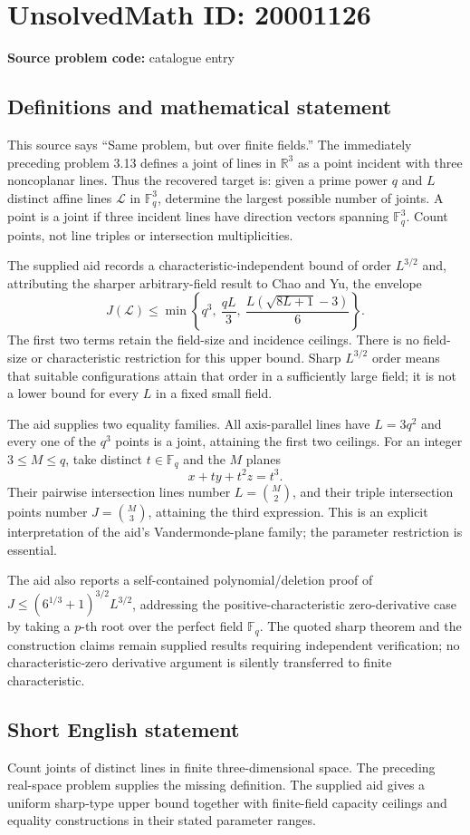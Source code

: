 \documentclass[11pt]{article}
\newcommand{\R}{\mathbb{R}}
\newcommand{\F}{\mathbb{F}}
\begin{document}
\section*{UnsolvedMath ID: 20001126}
\textbf{Source problem code:} catalogue entry
\subsection{Definitions and mathematical statement}
This source says ``Same problem, but over finite fields.'' The immediately preceding problem 3.13 defines a joint of lines in $\R^3$ as a point incident with three noncoplanar lines. Thus the recovered target is: given a prime power $q$ and $L$ distinct affine lines $\mathcal L$ in $\F_q^3$, determine the largest possible number of joints. A point is a joint if three incident lines have direction vectors spanning $\F_q^3$. Count points, not line triples or intersection multiplicities.

The supplied aid records a characteristic-independent bound of order $L^{3/2}$ and, attributing the sharper arbitrary-field result to Chao and Yu, the envelope
\[
 J(\mathcal L)\leq
 \min\left\{q^3,\ \frac{qL}{3},\
 \frac{L(\sqrt{8L+1}-3)}6\right\}.
\]
The first two terms retain the field-size and incidence ceilings. There is no field-size or characteristic restriction for this upper bound. Sharp $L^{3/2}$ order means that suitable configurations attain that order in a sufficiently large field; it is not a lower bound for every $L$ in a fixed small field.

The aid supplies two equality families. All axis-parallel lines have $L=3q^2$ and every one of the $q^3$ points is a joint, attaining the first two ceilings. For an integer $3\leq M\leq q$, take distinct $t\in\F_q$ and the $M$ planes
\[
 x+t y+t^2z=t^3.
\]
Their pairwise intersection lines number $L=\binom M2$, and their triple intersection points number $J=\binom M3$, attaining the third expression. This is an explicit interpretation of the aid's Vandermonde-plane family; the parameter restriction is essential.

The aid also reports a self-contained polynomial/deletion proof of
$J\leq(6^{1/3}+1)^{3/2}L^{3/2}$, addressing the positive-characteristic zero-derivative case by taking a $p$-th root over the perfect field $\F_q$. The quoted sharp theorem and the construction claims remain supplied results requiring independent verification; no characteristic-zero derivative argument is silently transferred to finite characteristic.
\subsection{Short English statement}
Count joints of distinct lines in finite three-dimensional space. The preceding real-space problem supplies the missing definition. The supplied aid gives a uniform sharp-type upper bound together with finite-field capacity ceilings and equality constructions in their stated parameter ranges.
\end{document}

